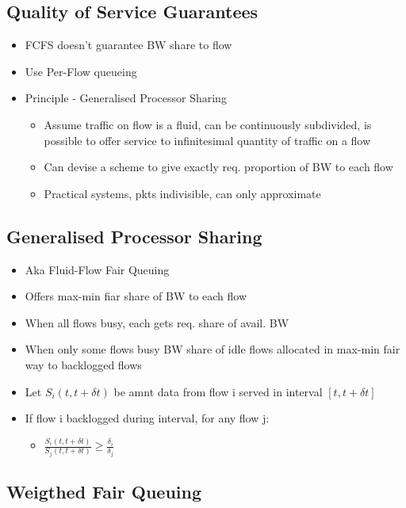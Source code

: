 \subsection{Quality of Service Guarantees}

\begin{itemize}
	\item FCFS doesn't guarantee BW share to flow
	\item Use Per-Flow queueing
	\item Principle - Generalised Processor Sharing
	\begin{itemize}
		\item Assume traffic on flow is a fluid, can be continuously
			subdivided, is possible to offer service to
			infinitesimal quantity of traffic on a flow
		\item Can devise a scheme to give exactly req. proportion of BW
			to each flow
		\item Practical systems, pkts indivisible, can only approximate
	\end{itemize}
\end{itemize}

\subsection{Generalised Processor Sharing}

\begin{itemize}
	\item Aka Fluid-Flow Fair Queuing
	\item Offers max-min fiar share of BW to each flow
	\item When all flows busy, each gets req. share of avail. BW
	\item When only some flows busy BW share of idle flows allocated in
		max-min fair way to backlogged flows
	\item Let $S_i(t, t +\delta t)$ be amnt data from flow i served in
		interval $[t, t+\delta t]$
	\item If flow i backlogged during interval, for any flow j:
	\begin{itemize}
		\item $\frac{S_i(t, t+\delta t)}{S_j(t, t+\delta t)} \ge
			\frac{\delta_i}{\delta_j}$
	\end{itemize}
\end{itemize}

\subsection{Weigthed Fair Queuing}

